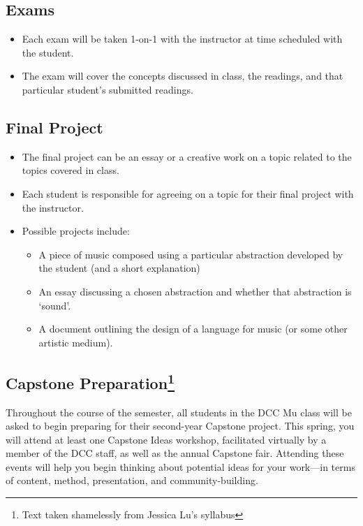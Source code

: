 \documentclass{article}
\begin{document}
\subsection*{Exams}

\begin{itemize}
  \item Each exam will be taken 1-on-1 with the instructor at time scheduled with the student.
  \item The exam will cover the concepts discussed in class, the readings, and that particular student's submitted readings.
\end{itemize}

\subsection*{Final Project}

\begin{itemize}
  \item The final project can be an essay or a creative work on a topic related to the topics covered in class.
  \item Each student is responsible for agreeing on a topic for their final project with the instructor.
  \item Possible projects include:
    \begin{itemize}
      \item A piece of music composed using a particular abstraction developed by the student (and a short explanation)
      \item An essay discussing a chosen abstraction and whether that abstraction is `sound'.
      \item A document outlining the design of a language for music (or some other artistic medium).
    \end{itemize}
\end{itemize}

\subsection*{Capstone Preparation\footnote{Text taken shamelessly from Jessica Lu's syllabus}}


Throughout the course of the semester, all students in the DCC Mu class will be asked to begin preparing for their second-year Capstone project.
This spring, you will attend at least one Capstone Ideas workshop, facilitated virtually by a member of the DCC staff, as well as the annual Capstone fair.
Attending these events will help you begin thinking about potential ideas for your work—in terms of content, method, presentation, and community-building.
\end{document}
